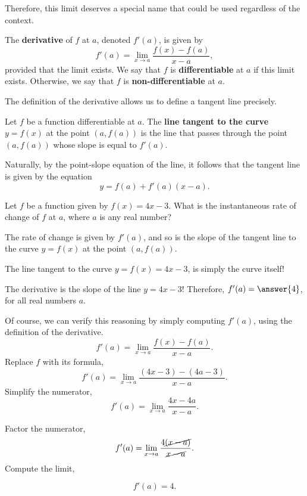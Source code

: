 \documentclass{ximera}
\begin{document}
    Therefore, this limit deserves a special name that could be used regardless of the context.
    \begin{definition}
  The \textbf{derivative} of $f$ at $a$, denoted $f'(a)$, is given by
  \[
 f'(a) = \lim_{x\to a} \frac{f(x) - f(a)}{x-a},
  \]
 provided that the limit exists. We say that $f$ is \textbf{differentiable}
  at $a$ if  this limit exists. Otherwise,  we say that  $f$ is \textbf{non-differentiable} at $a$.
\end{definition}

The definition of the derivative allows us to define a tangent line precisely.
  \begin{definition}
  Let $f$ be a function differentiable at $a$. The \textbf{ line tangent to the curve} $y=f(x)$ at the point $(a,f(a))$ is the line that passes through the point $(a,f(a))$ whose slope is equal to $f'(a)$.
    \end{definition}
  
  Naturally, by the point-slope equation of the line, it follows that the tangent line is given by the equation
  \[
 y = f(a)+f'(a)(x-a).
  \]

      \begin{question}
            Let $f$ be a function given by $f(x) = 4x-3$.
	What is the instantaneous rate of change of $f$ at $a$, where $a$ is any real number?
	\begin{hint}
		The rate of change is given by $f'(a)$, and so is the slope of the tangent line to the curve $y=f(x)$ at the point $(a,f(a))$.
	\end{hint}
	\begin{hint}
		The line tangent to the curve $y=f(x) = 4x-3$, is simply the curve itself!
	\end{hint}
	\begin{prompt}
		The derivative is the slope of the line $y= 4x-3$! Therefore,  $f'(a)=\answer{4}$, for all real numbers $a$.
	\end{prompt}
	\begin{hint}
		 Of course, we can verify this reasoning by simply computing $f'(a)$, using the definition of the derivative.
		 \[
 f'(a) = \lim_{x\to a} \frac{f(x) - f(a)}{x-a}.
  \]
Replace $f$ with its formula,
		\[
 f'(a) = \lim_{x\to a} \frac{(4x-3)-(4a-3)}{x-a}.
  \]
		Simplify the numerator,
			\[
 f'(a) = \lim_{x\to a} \frac{4x-4a}{x-a}.
  \]

		Factor the numerator,
		\[
 f'(a) = \lim_{x\to a} \frac{4\cancel{(x-a)}}{\cancel{x-a}}.
  \]
 Compute the limit,

		\[
 f'(a) =4.
  \]

			\end{hint}
\end{question}
\end{document}
